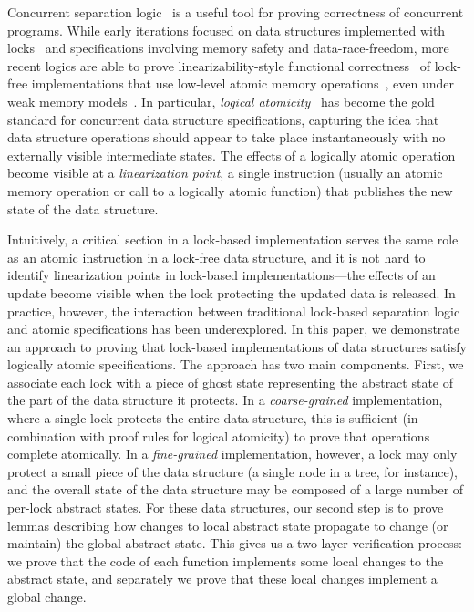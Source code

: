 

Concurrent separation logic~\cite{csl} is a useful tool for proving correctness of concurrent programs. While early iterations focused on data structures implemented with locks~\cite{gotsman, oraclesematic} and specifications involving memory safety and data-race-freedom, more recent logics are able to prove linearizability-style functional correctness~\cite{tada} of lock-free implementations that use low-level atomic memory operations~\cite{iris}, even under weak memory models~\cite{gps, rsl}. In particular, \emph{logical atomicity}~\cite{tada} has become the gold standard for concurrent data structure specifications, capturing the idea that data structure operations should appear to take place instantaneously with no externally visible intermediate states. The effects of a logically atomic operation become visible at a \emph{linearization point}, a single instruction (usually an atomic memory operation or call to a logically atomic function) that publishes the new state of the data structure.

Intuitively, a critical section in a lock-based implementation serves the same role as an atomic instruction in a lock-free data structure, and it is not hard to identify linearization points in lock-based implementations---the effects of an update become visible when the lock protecting the updated data is released. In practice, however, the interaction between traditional lock-based separation logic and atomic specifications has been underexplored. In this paper, we demonstrate an approach to proving that lock-based implementations of data structures satisfy logically atomic specifications. The approach has two main components. First, we associate each lock with a piece of ghost state representing the abstract state of the part of the data structure it protects. In a \emph{coarse-grained} implementation, where a single lock protects the entire data structure, this is sufficient (in combination with proof rules for logical atomicity) to prove that operations complete atomically. In a \emph{fine-grained} implementation, however, a lock may only protect a small piece of the data structure (a single node in a tree, for instance), and the overall state of the data structure may be composed of a large number of per-lock abstract states. For these data structures, our second step is to prove lemmas describing how changes to local abstract state propagate to change (or maintain) the global abstract state. This gives us a two-layer verification process: we prove that the code of each function implements some local changes to the abstract state, and separately we prove that these local changes implement a global change.

